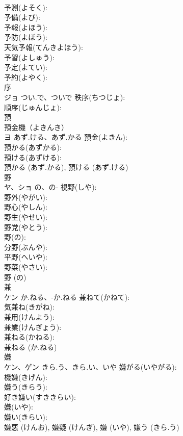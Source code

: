 \documentclass[8pt]{extreport}
\begin{document}
\begin{CJK}{UTF8}{min}
\\	予測(よそく): 
\\	予備(よび): 
\\	予報(よほう): 
\\	予防(よぼう): 
\\	天気予報(てんきよほう): 
\\	予習(よしゅう): 
\\	予定(よてい): 
\\	予約(よやく): 
\\	序			
\\	ジョ	つい.で、ついで	秩序(ちつじょ): 
\\	順序(じゅんじょ): 
\\	預			
\\	預金機（よきんき）
\\	ヨ	あず.ける、あず.かる	預金(よきん): 
\\	預かる(あずかる): 
\\	預ける(あずける): 
\\	預かる (あず.かる), 預ける (あず.ける)
\\	野			
\\	ヤ、ショ	の、の-	視野(しや): 
\\	野外(やがい): 
\\	野心(やしん): 
\\	野生(やせい): 
\\	野党(やとう): 
\\	野(の): 
\\	分野(ぶんや): 
\\	平野(へいや): 
\\	野菜(やさい): 
\\	野 (の)
\\	兼			
\\	ケン	か.ねる、-か.ねる	兼ねて(かねて): 
\\	気兼ね(きがね): 
\\	兼用(けんよう): 
\\	兼業(けんぎょう): 
\\	兼ねる(かねる): 
\\	兼ねる (か.ねる)
\\	嫌			
\\	ケン、ゲン	きら.う、きら.い、いや	嫌がる(いやがる): 
\\	機嫌(きげん): 
\\	嫌う(きらう): 
\\	好き嫌い(すききらい): 
\\	嫌(いや): 
\\	嫌い(きらい): 
\\	嫌悪 (けんお), 嫌疑 (けんぎ), 嫌 (いや), 嫌う (きら.う)

\end{CJK}
\end{document}
